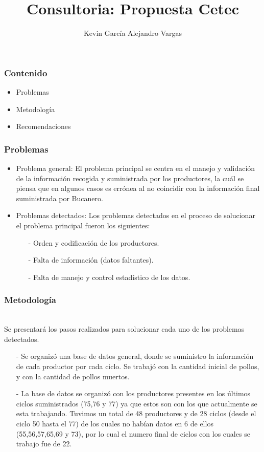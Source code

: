 \documentclass[11pt]{beamer}
\author[Kevin García - Alejandro Vargas]{Kevin García \newline Alejandro Vargas }
\title[Consultoria]{Consultoria: Propuesta Cetec}
\begin{document}
\justify
\begin{frame}
\titlepage
\end{frame}


\begin{frame}
\frametitle{Contenido}
\begin{itemize}
\item Problemas
\item Metodología
\item Recomendaciones
\end{itemize}
\end{frame}

\begin{frame}
\frametitle{Problemas}
\begin{itemize}
\item Problema general: El problema principal se centra en el manejo y validación de la información recogida y suministrada por los productores, la cuál se piensa que en algunos casos es errónea al no coincidir con la información final suministrada por Bucanero.
\item Problemas detectados: Los problemas detectados en el proceso de solucionar el problema principal fueron los siguientes:
\begin{itemize}
\item[-]Orden y codificación de los productores.
\item[-]Falta de información (datos faltantes).
\item[-]Falta de manejo y control estadístico de los datos.
\end{itemize}
\end{itemize}
\end{frame}

\begin{frame}
\frametitle{Metodología}
~\\Se presentará los pasos realizados para solucionar cada uno de los problemas detectados.
\begin{itemize}
\item[-]Se organizó una base de datos general, donde se suministro la información de cada productor por cada ciclo. Se trabajó con la cantidad inicial de pollos, y con la cantidad de pollos muertos.
\item[-]La base de datos se organizó con los productores presentes en los últimos ciclos suministrados (75,76 y 77) ya que estos son con los que actualmente se esta trabajando. Tuvimos un total de 48 productores y de 28 ciclos (desde el ciclo 50 hasta el 77) de los cuales no habían datos en 6 de ellos (55,56,57,65,69 y 73), por lo cual el numero final de ciclos con los cuales se trabajo fue de 22.
\end{itemize}
\end{frame}
\end{document}
